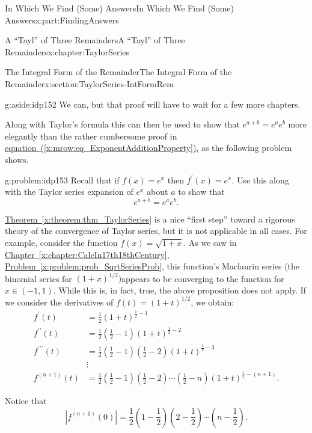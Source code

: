 \documentclass[oneside,10pt,]{book}
\newcommand{\xreffont}{\relax}
\numberwithin{equation}{section}
\newcommand{\amp}{&}
\begin{document}
\begin{partptx}{In Which We Find (Some) Answers}{}{In Which We Find (Some) Answers}{}{}{x:part:FindingAnswers}
\begin{chapterptx}{A ``Tayl'' of Three Remainders}{}{A ``Tayl'' of Three Remainders}{}{}{x:chapter:TaylorSeries}
\begin{sectionptx}{The Integral Form of the Remainder}{}{The Integral Form of the Remainder}{}{}{x:section:TaylorSeries-IntFormRem}
\begin{aside}{}{g:aside:idp152}%
We can, but that proof will have to wait for a few more chapters.%
\end{aside}
Along with Taylor's formula this can then be used to show that \(e^{a+b}=e^ae^b\) more elegantly than the rather cumbersome proof in \hyperref[x:mrow:eq_ExponentAdditionProperty]{equation~({\xreffont\ref{x:mrow:eq_ExponentAdditionProperty}})}, as the following problem shows.%
\begin{problem}{}{g:problem:idp153}%
 Recall that if \(f(x)=e^x\) then \(f^\prime(x) = e^x\). Use this along with the Taylor series expansion of \(e^x\) about \(a\) to show that%
\begin{equation*}
e^{a+b}=e^ae^b.
\end{equation*}
%
\end{problem}
\hyperref[x:theorem:thm_TaylorSeries]{Theorem~{\xreffont\ref{x:theorem:thm_TaylorSeries}}} is a nice ``first step'' toward a rigorous theory of the convergence of Taylor series, but it is not applicable in all cases. For example, consider the function \(f(x)=\sqrt{1+x}\). As we saw in \hyperref[x:chapter:CalcIn17th18thCentury]{Chapter~{\xreffont\ref{x:chapter:CalcIn17th18thCentury}}}, \hyperref[x:problem:prob_SqrtSeriesProb]{Problem~{\xreffont\ref{x:problem:prob_SqrtSeriesProb}}}, this function's Maclaurin series (the binomial series for \(\left(1+x\right)^{1/2})\)appears to be converging to the function for \(x\in(-1,1)\). While this is, in fact, true, the above proposition does not apply. If we consider the derivatives of \(f(t)=(1+t)^{1/2}\), we obtain:%
\begin{align*}
f^\prime(t)\amp =\frac{1}{2}(1+t)^{\frac{1}{2}-1}\\
f^{\prime\prime}(t)\amp =\frac{1}{2}\left(\frac{1}{2}-1\right)(1+t)^{\frac{1}{2}-2}\\
f^{\prime\prime\prime}(t)\amp =\frac{1}{2}\left(\frac{1}{2}-1\right)\left(\frac{1}{2}-2 \right)(1+t)^{\frac{1}{2}-3}\\
\amp \vdots\\
f^{(n+1)}(t)\amp =\frac{1}{2}\left(\frac{1}{2}-1\right)\left(\frac{1}{2}-2\right) \cdots\left(\frac{1}{2}-n\right)(1+t)^{\frac{1}{2}-(n+1)}\text{.}
\end{align*}
%
\par
Notice that%
\begin{equation*}
\left|f^{(n+1)}(0)\right|=\frac{1}{2}\left(1-\frac{1}{2}\right)\left(2-\frac{1}{2}\right)\cdots\left(n-\frac{1}{2}\right)\text{.}

\end{equation*}
\end{sectionptx}
\end{chapterptx}
\end{partptx}
\end{document}
